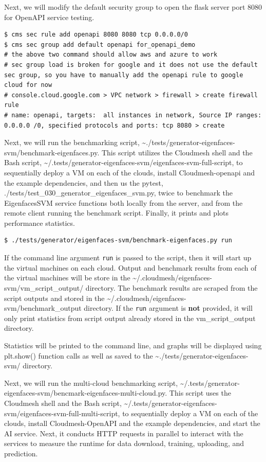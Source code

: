 Next, we will modify the default security group to open the flask server
port 8080 for OpenAPI service testing.

\begin{verbatim}
$ cms sec rule add openapi 8080 8080 tcp 0.0.0.0/0
$ cms sec group add default openapi for_openapi_demo
# the above two command should allow aws and azure to work
# sec group load is broken for google and it does not use the default sec group, so you have to manually add the openapi rule to google cloud for now
# console.cloud.google.com > VPC network > firewall > create firewall rule
# name: openapi, targets:  all instances in network, Source IP ranges: 0.0.0.0 /0, specified protocols and ports: tcp 8080 > create
\end{verbatim}

Next, we will run the benchmarking script,
\textasciitilde./tests/generator-eigenfaces-svm/benchmark-eigenfaces.py.
This script utilizes the Cloudmesh shell and the Bash script,
\textasciitilde/.tests/generator-eigenfaces-svm/eigenfaces-svm-full-script,
to sequentially deploy a VM on each of the clouds, install
Cloudmesh-openapi and the example dependencies, and then us the pytest,
./tests/test\_030\_generator\_eigenfaces\_svm.py, twice to benchmark the
EigenfacesSVM service functions both locally from the server, and from
the remote client running the benchmark script. Finally, it prints and
plots performance statistics.

\begin{verbatim}
$ ./tests/generator/eigenfaces-svm/benchmark-eigenfaces.py run
\end{verbatim}

If the command line argument \texttt{run} is passed to the script, then
it will start up the virtual machines on each cloud. Output and
benchmark results from each of the virtual machines will be store in the
\textasciitilde/.cloudmesh/eigenfaces-svm/vm\_script\_output/ directory.
The benchmark results are scraped from the script outputs and stored in
the \textasciitilde/.cloudmesh/eigenfaces-svm/benchmark\_output
directory. If the \texttt{run} argument is \textbf{not} provided, it
will only print statistics from script output already stored in the
vm\_script\_output directory.

Statistics will be printed to the command line, and graphs will be
displayed using plt.show() function calls as well as saved to the
\textasciitilde./tests/generator-eigenfaces-svm/ directory.

Next, we will run the multi-cloud benchmarking script,
\textasciitilde/.tests/generator-eigenfaces-svm/bencmark-eigenfaces-multi-cloud.py.
This script uses the Cloudmesh shell and the Bash script,
\textasciitilde/.tests/generator-eigenfaces-svm/eigenfaces-svm-full-multi-script,
to sequentially deploy a VM on each of the clouds, install
Cloudmesh-OpenAPI and the example dependencies, and start the AI
service. Next, it conducts HTTP requests in parallel to interact with
the services to measure the runtime for data download, training,
uploading, and prediction.

